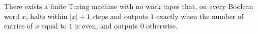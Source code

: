 \begin{theorem}
\label{Complexity.exists_zeroTape_parity_decider}
\leanok
{}
There exists a finite Turing machine with no work tapes that, on every Boolean word $x$,
halts within $|x|+1$ steps and outputs $1$ exactly when the number of entries of $x$
equal to $1$ is even, and outputs $0$ otherwise.
\end{theorem}
